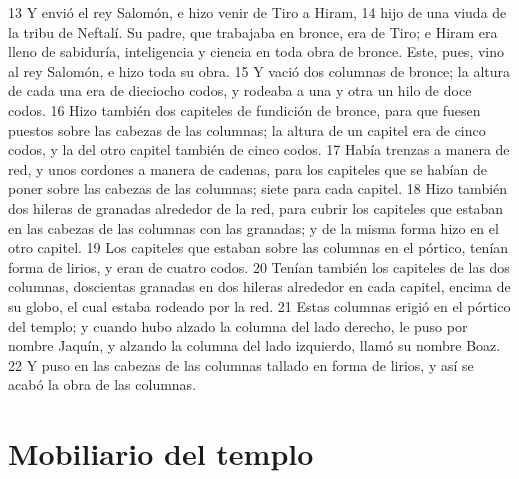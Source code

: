 13 Y envió el rey Salomón, e hizo venir de Tiro a Hiram,
14 hijo de una viuda de la tribu de Neftalí. Su padre, que trabajaba en bronce, era de Tiro; e Hiram era lleno de sabiduría, inteligencia y ciencia en toda obra de bronce. Este, pues, vino al rey Salomón, e hizo toda su obra.
15 Y vació dos columnas de bronce; la altura de cada una era de dieciocho codos,  y rodeaba a una y otra un hilo de doce codos.
16 Hizo también dos capiteles de fundición de bronce, para que fuesen puestos sobre las cabezas de las columnas; la altura de un capitel era de cinco codos,  y la del otro capitel también de cinco codos.
17 Había trenzas a manera de red, y unos cordones a manera de cadenas, para los capiteles que se habían de poner sobre las cabezas de las columnas; siete para cada capitel.
18 Hizo también dos hileras de granadas alrededor de la red, para cubrir los capiteles que estaban en las cabezas de las columnas con las granadas; y de la misma forma hizo en el otro capitel.
19 Los capiteles que estaban sobre las columnas en el pórtico, tenían forma de lirios, y eran de cuatro codos.
20 Tenían también los capiteles de las dos columnas, doscientas granadas en dos hileras alrededor en cada capitel, encima de su globo, el cual estaba rodeado por la red.
21 Estas columnas erigió en el pórtico del templo; y cuando hubo alzado la columna del lado derecho, le puso por nombre Jaquín, y alzando la columna del lado izquierdo, llamó su nombre Boaz.
22 Y puso en las cabezas de las columnas tallado en forma de lirios, y así se acabó la obra de las columnas.

\section*{Mobiliario del templo}

